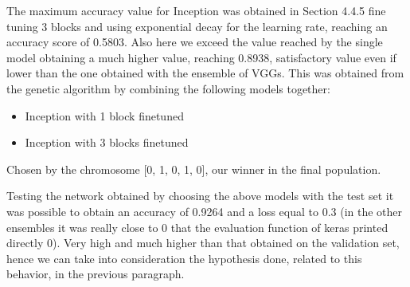 The maximum accuracy value for Inception was obtained in Section 4.4.5 fine tuning 3 blocks and using exponential decay for the learning rate, reaching an accuracy score of 0.5803. Also here we exceed the value reached by the single model obtaining a much higher value, reaching 0.8938, satisfactory value even if lower than the one obtained with the ensemble of VGGs. This was obtained from the genetic algorithm by combining the following models together:
 \begin{itemize}
	\item Inception with 1 block finetuned
	\item Inception with 3 blocks finetuned
\end{itemize}
Chosen by the chromosome [0, 1, 0, 1, 0], our winner in the final population.

Testing the network obtained by choosing the above models with the test set it was possible to obtain an accuracy of 0.9264 and a loss equal to 0.3 (in the other ensembles it was really close to 0 that the evaluation function of keras printed directly 0). Very high and much higher than that obtained on the validation set, hence we can take into consideration the hypothesis done, related to this behavior, in the previous paragraph.


